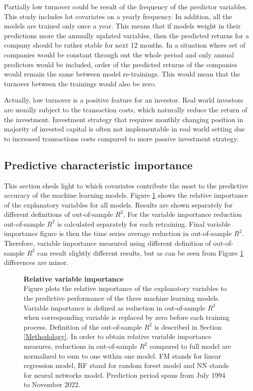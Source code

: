 \documentclass{article}
\begin{document}
Partially low turnover could be result of the frequency of the predictor variables. This study includes lot covariates on a yearly frequency. In addition, all the models are trained only once a year. This means that if models weight in their predictions more the annually updated variables, then the predicted returns for a company should be rather stable for next 12 months. In a situation where set of companies would be constant through out the whole period and only annual predictors would be included, order of the predicted returns of the companies would remain the same between model re-trainings. This would mean that the turnover between the trainings would also be zero. \par

Actually, low turnover is a positive feature for an investor. Real world investors are usually subject to the transaction costs, which naturally reduce the return of the investment. Investment strategy that requires monthly changing position in majority of invested capital is often not implementable in real world setting due to increased transactions costs compared to more passive investment strategy. \par

\subsection{Predictive characteristic importance}\label{PredictiveCharacteristicImportance}

This section sheds light to which covariates contribute the most to the predictive accuracy of the machine learning models. Figure \ref{plot:relative_VI} shows the relative importance of the explanatory variables for all models. Results are shown separately for different definitions of out-of-sample $R^2$. For the variable importance reduction out-of-sample $R^2$ is calculated separately for each retraining. Final variable importance figure is then the time series average reduction in out-of-sample $R^2$. Therefore, variable importance measured using different definition of out-of-sample $R^2$ can result slightly different results, but as can be seen from Figure \ref{plot:relative_VI} differences are minor. \par

\begin{figure}[p]
\centering
\caption[Relative variable importance]{\textbf{Relative variable importance}\\ Figure plots the relative importance of the explanatory variables to the predictive performance of the three machine learning models. Variable importance is defined as reduction in out-of-sample $R^2$ when corresponding variable is replaced by zero before each training process. Definition of the out-of-sample $R^2$ is described in Section \ref{Methodology}. In order to obtain relative variable importance measures, reductions in out-of-sample $R^2$ compared to full model are normalized to sum to one within one model. FM stands for linear regression model, RF stand for random forest model and NN stands for neural networks model. Prediction period spans from July 1994 to November 2022.}

\label{plot:relative_VI}
\end{figure}
\end{document}
